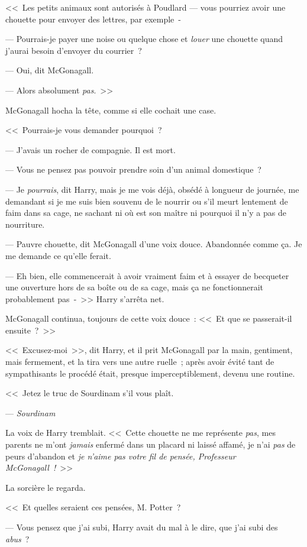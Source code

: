 <<~Les petits animaux sont autorisés à Poudlard — vous pourriez avoir une chouette pour envoyer des lettres, par exemple~-

--- Pourrais-je payer une noise ou quelque chose et \emph{louer} une chouette quand j'aurai besoin d'envoyer du courrier~?

--- Oui, dit McGonagall.

--- Alors absolument \emph{pas}.~>>

McGonagall hocha la tête, comme si elle cochait une case. 

<<~Pourrais-je vous demander pourquoi~?

--- J'avais un rocher de compagnie. Il est mort.

--- Vous ne pensez pas pouvoir prendre soin d'un animal domestique~?

--- Je \emph{pourrais}, dit Harry, mais je me vois déjà, obsédé à longueur de journée, me demandant si je me suis bien souvenu de le nourrir ou s'il meurt lentement de faim dans sa cage, ne sachant ni où est son maître ni pourquoi il n'y a pas de nourriture.

--- Pauvre chouette, dit McGonagall d'une voix douce. Abandonnée comme ça. Je me demande ce qu'elle ferait.

--- Eh bien, elle commencerait à avoir vraiment faim et à essayer de becqueter une ouverture hors de sa boîte ou de sa cage, mais ça ne fonctionnerait probablement pas~-~>> Harry s'arrêta net.

McGonagall continua, toujours de cette voix douce~: <<~Et que se passerait-il ensuite~?~>>

<<~Excusez-moi~>>, dit Harry, et il prit McGonagall par la main, gentiment, mais fermement, et la tira vers une autre ruelle~; après avoir évité tant de sympathisants le procédé était, presque imperceptiblement, devenu une routine.

<<~Jetez le truc de Sourdinam s'il vous plaît.

--- \emph{Sourdinam}

La voix de Harry tremblait. <<~Cette chouette ne me représente \emph{pas}, mes parents ne m'ont \emph{jamais} enfermé dans un placard ni laissé affamé, je n'ai \emph{pas} de peurs d'abandon et \emph{je n'aime pas votre fil de pensée, Professeur McGonagall~!}~>>

La sorcière le regarda.

<<~Et quelles seraient ces pensées, M. Potter~?

--- Vous pensez que j'ai subi, Harry avait du mal à le dire, que j'ai subi des \emph{abus}~?

